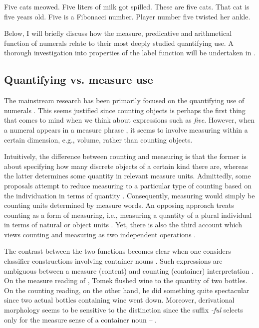 \documentclass[output=paper]{langscibook}
\begin{document}
		\ea\label{ex:uses} \ea Five cats meowed.\label{ex:uses-quantifying}
	\ex Five liters of milk got spilled.\label{ex:uses-measure}
	\ex These are five cats.\label{ex:uses-predicative}
	\ex That cat is five years old.\label{ex:uses-predicative-measure}
	\ex Five is a Fibonacci number.\label{ex:uses-arithmetical}
	\ex Player number five twisted her ankle.\label{ex:uses-label} 
	\z
	\z
	
	\noindent Below, I will briefly discuss how the measure, predicative and arithmetical function of numerals relate to their most deeply studied quantifying use. %
    A thorough investigation into properties of the label function will be undertaken in .
	
	\subsection{Quantifying vs. measure use}\label{sec:quantifying-vs-measure-use}

The mainstream research has been primarily focused on the quantifying use of numerals . This seems justified since counting objects is perhaps the first thing that comes to mind when we think about expressions such as \textit{five}. However, when a numeral appears in a measure phrase , it seems to involve measuring within a certain dimension, e.g., volume, rather than counting objects. 

Intuitively, the difference between counting and measuring is that the former is about specifying how many discrete objects of a certain kind there are, whereas the latter determines some quantity in relevant measure units. Admittedly, some proposals attempt to reduce measuring to a particular type of counting based on the individuation in terms of quantity  \citep{Lyons1977,matushansky_zwarts2017making}. Consequently, measuring would simply be counting units determined by measure words. An opposing approach treats counting as a form of measuring, i.e., measuring a quantity of a plural individual in terms of natural or object units \citep{Krifka1989,krifka1995common}. Yet, there is also the third account which views counting and measuring as two independent operations \citep{rothstein2017semantics}.

The contrast between the two functions becomes clear when one considers classifier constructions involving container nouns . Such expressions are ambiguous between a measure (content) and counting (container) interpretation \citep[e.g.,][]{landman2004indefinites,grimshaw2007boxes,partee_borschev2012sortal}. On the measure reading of , Tomek flushed wine to the quantity of two bottles. On the counting reading, on the other hand, he did something quite spectacular since two actual bottles containing wine went down. Moreover, derivational morphology seems to be sensitive to the distinction since the suffix \textit{-ful} selects only for the measure sense of a container noun -- \citep{rothstein2011counting}.
\end{document}
